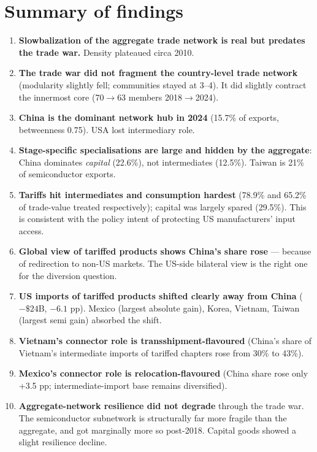 \documentclass[11pt,a4paper]{article}
\begin{document}
\section{Summary of findings}

\begin{enumerate}[leftmargin=*]
  \item \textbf{Slowbalization of the aggregate trade network is real but
        predates the trade war.} Density plateaued circa 2010.
  \item \textbf{The trade war did not fragment the country-level trade
        network} (modularity slightly fell; communities stayed at 3--4).
        It did slightly contract the innermost core (70$\to$63 members
        2018$\to$2024).
  \item \textbf{China is the dominant network hub in 2024} (15.7\% of
        exports, betweenness 0.75). USA lost intermediary role.
  \item \textbf{Stage-specific specialisations are large and hidden by
        the aggregate}: China dominates \textit{capital} (22.6\%), not
        intermediates (12.5\%). Taiwan is 21\% of semiconductor exports.
  \item \textbf{Tariffs hit intermediates and consumption hardest} (78.9\%
        and 65.2\% of trade-value treated respectively); capital was
        largely spared (29.5\%). This is consistent with the policy
        intent of protecting US manufacturers' input access.
  \item \textbf{Global view of tariffed products shows China's share rose}
        — because of redirection to non-US markets. The US-side bilateral
        view is the right one for the diversion question.
  \item \textbf{US imports of tariffed products shifted clearly away from
        China} ($-\$24$B, $-6.1$ pp). Mexico (largest absolute gain),
        Korea, Vietnam, Taiwan (largest semi gain) absorbed the shift.
  \item \textbf{Vietnam's connector role is transshipment-flavoured}
        (China's share of Vietnam's intermediate imports of tariffed
        chapters rose from 30\% to 43\%).
  \item \textbf{Mexico's connector role is relocation-flavoured}
        (China share rose only +3.5 pp; intermediate-import base
        remains diversified).
  \item \textbf{Aggregate-network resilience did not degrade} through the
        trade war. The semiconductor subnetwork is structurally far more
        fragile than the aggregate, and got marginally more so post-2018.
        Capital goods showed a slight resilience decline.
\end{enumerate}
\end{document}
